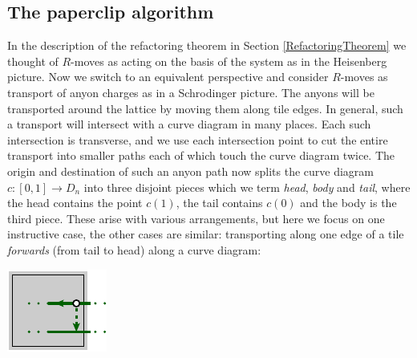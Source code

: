 %



%
%

\subsection{The paperclip algorithm}

In the description of the refactoring theorem
in Section \ref{RefactoringTheorem}
we thought of $R$-moves as acting on the basis of
the system as in the Heisenberg picture.
Now we switch to an equivalent perspective and
consider $R$-moves as transport of anyon charges
as in a Schrodinger picture.
The anyons will be transported around the lattice
by moving them along tile edges.
In general, such a transport will intersect with a
curve diagram in many places.
Each such intersection is transverse,
and we use each intersection point to cut
the entire transport into smaller paths each of
which touch the curve diagram twice.
The origin and destination of such an anyon path
now splits the curve diagram $c:[0, 1]\to D_n$ 
into three disjoint pieces which we term
\emph{head}, \emph{body} and \emph{tail}, where
the head contains the point $c(1)$, the tail
contains $c(0)$ and the body is the third piece.
These arise with various arrangements, but here
we focus on one instructive case, the
other cases are similar:
transporting along one edge of a tile \emph{forwards} 
(from tail to head) along a curve diagram:
\begin{center}
\includegraphics[]{pic-move-anyon.pdf}
\end{center}

